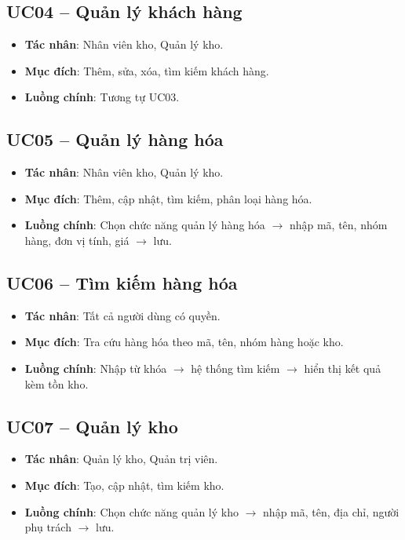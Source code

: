 \subsection{UC04 -- Quản lý khách hàng}

\begin{itemize}[leftmargin=1.5cm]
    \item \textbf{Tác nhân}: Nhân viên kho, Quản lý kho.
    \item \textbf{Mục đích}: Thêm, sửa, xóa, tìm kiếm khách hàng.
    \item \textbf{Luồng chính}: Tương tự UC03.
\end{itemize}

\subsection{UC05 -- Quản lý hàng hóa}

\begin{itemize}[leftmargin=1.5cm]
    \item \textbf{Tác nhân}: Nhân viên kho, Quản lý kho.
    \item \textbf{Mục đích}: Thêm, cập nhật, tìm kiếm, phân loại hàng hóa.
    \item \textbf{Luồng chính}: Chọn chức năng quản lý hàng hóa $\rightarrow$ nhập mã, tên, nhóm hàng, đơn vị tính, giá $\rightarrow$ lưu.
\end{itemize}

\subsection{UC06 -- Tìm kiếm hàng hóa}

\begin{itemize}[leftmargin=1.5cm]
    \item \textbf{Tác nhân}: Tất cả người dùng có quyền.
    \item \textbf{Mục đích}: Tra cứu hàng hóa theo mã, tên, nhóm hàng hoặc kho.
    \item \textbf{Luồng chính}: Nhập từ khóa $\rightarrow$ hệ thống tìm kiếm $\rightarrow$ hiển thị kết quả kèm tồn kho.
\end{itemize}

\subsection{UC07 -- Quản lý kho}

\begin{itemize}[leftmargin=1.5cm]
    \item \textbf{Tác nhân}: Quản lý kho, Quản trị viên.
    \item \textbf{Mục đích}: Tạo, cập nhật, tìm kiếm kho.
    \item \textbf{Luồng chính}: Chọn chức năng quản lý kho $\rightarrow$ nhập mã, tên, địa chỉ, người phụ trách $\rightarrow$ lưu.
\end{itemize}

